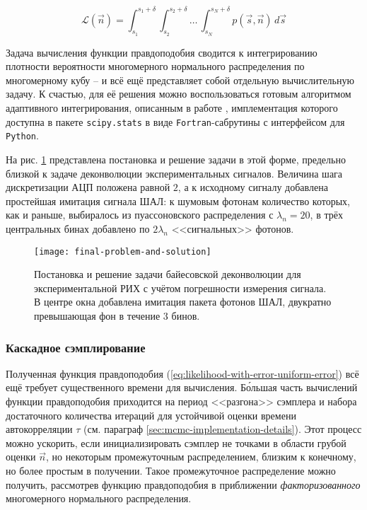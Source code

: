 \begin{equation}
	\label{eq:likelihood-with-error-uniform-error}
	\mathcal{L}(\vec{n}) = \int_{s_1}^{s_1 + \delta} \int_{s_2}^{s_2 + \delta} \ldots \, \int_{s_{N}}^{s_N + \delta} p(\vec{s}, \vec{n}) \, d\vec{s}
\end{equation}

Задача вычисления функции правдоподобия сводится к интегрированию плотности вероятности многомерного нормального распределения по многомерному кубу -- и всё ещё представляет собой отдельную вычислительную задачу. К счастью, для её решения можно воспользоваться готовым алгоритмом адаптивного интегрирования, описанным в работе \cite{Genz1992}, имплементация которого доступна в пакете \verb|scipy.stats| \cite{2020SciPy-NMeth} в виде \verb|Fortran|-сабрутины с интерфейсом для \verb|Python|.

На рис. \ref{pic:bayesian-deconvolution-with-experimantal-rir-and-rounding} представлена постановка и решение задачи в этой форме, предельно близкой к задаче деконволюции экспериментальных сигналов. Величина шага дискретизации АЦП положена равной $2$, а к исходному сигналу добавлена простейшая имитация сигнала ШАЛ: к шумовым фотонам количество которых, как и раньше, выбиралось из пуассоновского распределения с $\lambda_n = 20$, в трёх центральных бинах добавлено по $2\lambda_n$ <<сигнальных>> фотонов.

\begin{figure}
	\centering
	\texttt{[image: final-problem-and-solution]}
	\caption{Постановка и решение задачи байесовской деконволюции для экспериментальной РИХ с учётом погрешности измерения сигнала. В центре окна добавлена имитация пакета фотонов ШАЛ, двукратно превышающая фон в течение 3 бинов.}
	\label{pic:bayesian-deconvolution-with-experimantal-rir-and-rounding}
\end{figure}

\subsubsection{Каскадное сэмплирование}

Полученная функция правдоподобия (\ref{eq:likelihood-with-error-uniform-error}) всё ещё требует существенного времени для вычисления. Б\'{о}льшая часть вычислений функции правдоподобия приходится на период <<разгона>> сэмплера и набора достаточного количества итераций для устойчивой оценки времени автокорреляции $\tau$ (см. параграф \ref{sec:mcmc-implementation-details}). Этот процесс можно ускорить, если инициализировать сэмплер не точками в области грубой оценки $\vec{n}$, но некоторым промежуточным распределением, близким к конечному, но более простым в получении. Такое промежуточное распределение можно получить, рассмотрев функцию правдоподобия в приближении \textit{факторизованного} многомерного нормального распределения.

